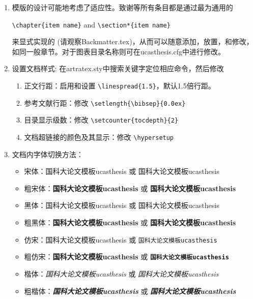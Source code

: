 \begin{enumerate}
    \item 模版的设计可能地考虑了适应性。致谢等所有条目都是通过最为通用的

        \verb+\chapter{item name}+  and \verb+\section*{item name}+

        来显式实现的 (请观察Backmatter.tex)，从而可以随意添加，放置，和修改，如同一般章节。对于图表目录名称则可在ucasthesis.cfg中进行修改。

    \item 设置文档样式: 在artratex.sty中搜索关键字定位相应命令，然后修改
        \begin{enumerate}
            \item 正文行距：启用和设置 \verb|\linespread{1.5}|，默认1.5倍行距。
            \item 参考文献行距：修改 \verb|\setlength{\bibsep}{0.0ex}|
            \item 目录显示级数：修改 \verb|\setcounter{tocdepth}{2}|
            \item 文档超链接的颜色及其显示：修改 \verb|\hypersetup|
        \end{enumerate}

    \item 文档内字体切换方法：
        \begin{itemize}
            \item 宋体：国科大论文模板ucasthesis 或 \textrm{国科大论文模板ucasthesis}
            \item 粗宋体：{\bfseries 国科大论文模板ucasthesis} 或 \textbf{国科大论文模板ucasthesis}
            \item 黑体：{\sffamily 国科大论文模板ucasthesis} 或 \textsf{国科大论文模板ucasthesis}
            \item 粗黑体：{\bfseries\sffamily 国科大论文模板ucasthesis} 或 \textsf{\bfseries 国科大论文模板ucasthesis}
            \item 仿宋：{\ttfamily 国科大论文模板ucasthesis} 或 \texttt{国科大论文模板ucasthesis}
            \item 粗仿宋：{\bfseries\ttfamily 国科大论文模板ucasthesis} 或 \texttt{\bfseries 国科大论文模板ucasthesis}
            \item 楷体：{\itshape 国科大论文模板ucasthesis} 或 \textit{国科大论文模板ucasthesis}
            \item 粗楷体：{\bfseries\itshape 国科大论文模板ucasthesis} 或 \textit{\bfseries 国科大论文模板ucasthesis}
        \end{itemize}
\end{enumerate}


